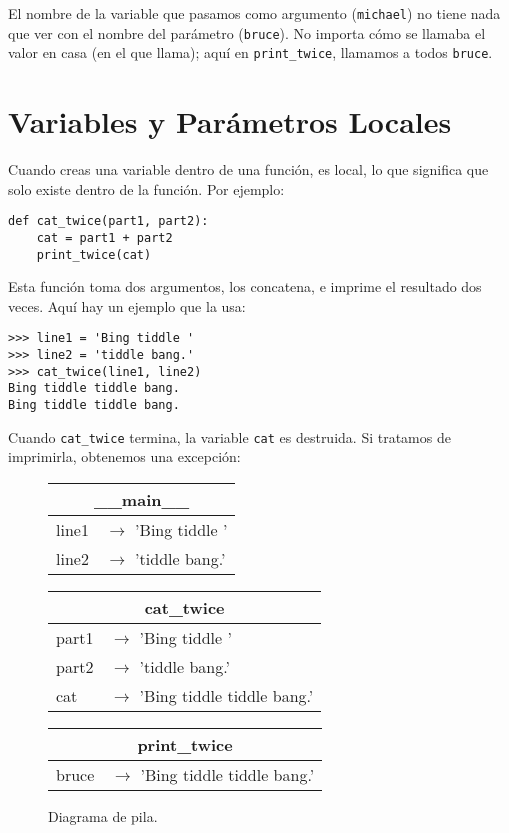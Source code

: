 El nombre de la variable que pasamos como argumento (\texttt{michael}) no tiene nada que ver con el nombre del parámetro (\texttt{bruce}). No importa cómo se llamaba el valor en casa (en el que llama); aquí en \texttt{print\_twice}, llamamos a todos \texttt{bruce}.

\section{Variables y Parámetros Locales}

Cuando creas una variable dentro de una función, es local, lo que significa que solo existe dentro de la función. Por ejemplo:

\begin{lstlisting}
def cat_twice(part1, part2):
    cat = part1 + part2
    print_twice(cat)
\end{lstlisting}

Esta función toma dos argumentos, los concatena, e imprime el resultado dos veces. Aquí hay un ejemplo que la usa:

\begin{lstlisting}
>>> line1 = 'Bing tiddle '
>>> line2 = 'tiddle bang.'
>>> cat_twice(line1, line2)
Bing tiddle tiddle bang.
Bing tiddle tiddle bang.
\end{lstlisting}

Cuando \texttt{cat\_twice} termina, la variable \texttt{cat} es destruida. Si tratamos de imprimirla, obtenemos una excepción:

\begin{figure}[h]
\centering
\begin{tabular}{|l|l|}
\hline
\multicolumn{2}{|c|}{\textbf{\_\_main\_\_}} \\
\hline
line1 & $\longrightarrow$ 'Bing tiddle ' \\
line2 & $\longrightarrow$ 'tiddle bang.' \\
\hline
\end{tabular}

\vspace{0.5cm}

\begin{tabular}{|l|l|}
\hline
\multicolumn{2}{|c|}{\textbf{cat\_twice}} \\
\hline
part1 & $\longrightarrow$ 'Bing tiddle ' \\
part2 & $\longrightarrow$ 'tiddle bang.' \\
cat & $\longrightarrow$ 'Bing tiddle tiddle bang.' \\
\hline
\end{tabular}

\vspace{0.5cm}

\begin{tabular}{|l|l|}
\hline
\multicolumn{2}{|c|}{\textbf{print\_twice}} \\
\hline
bruce & $\longrightarrow$ 'Bing tiddle tiddle bang.' \\
\hline
\end{tabular}

\caption{Diagrama de pila.}
\label{fig:stack_diagram}
\end{figure}

